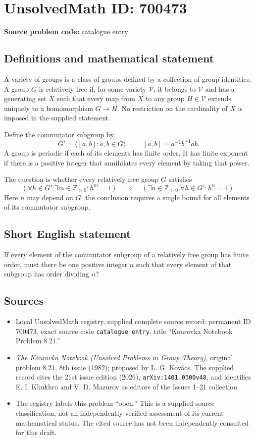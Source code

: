 \documentclass[11pt]{article}
\newcommand{\Z}{\mathbb{Z}}
\begin{document}
\section*{UnsolvedMath ID: 700473}
\textbf{Source problem code:} catalogue entry
\subsection{Definitions and mathematical statement}
A variety of groups is a class of groups defined by a collection of group identities. A group \(G\) is relatively free if, for some variety \(\mathcal V\), it belongs to \(\mathcal V\) and has a generating set \(X\) such that every map from \(X\) to any group \(H\in\mathcal V\) extends uniquely to a homomorphism \(G\to H\). No restriction on the cardinality of \(X\) is imposed in the supplied statement.

Define the commutator subgroup by
\[
G'=\langle [a,b]:a,b\in G\rangle,
\qquad [a,b]=a^{-1}b^{-1}ab.
\]
A group is periodic if each of its elements has finite order. It has finite exponent if there is a positive integer that annihilates every element by taking that power.

The question is whether every relatively free group \(G\) satisfies
\[
\left(\forall h\in G'\;\exists m\in\Z_{>0}:h^m=1\right)
\quad\Longrightarrow\quad
\left(\exists n\in\Z_{>0}\;\forall h\in G':h^n=1\right).
\]
Here \(n\) may depend on \(G\); the conclusion requires a single bound for all elements of its commutator subgroup.
\subsection{Short English statement}
If every element of the commutator subgroup of a relatively free group has finite order, must there be one positive integer \(n\) such that every element of that subgroup has order dividing \(n\)?
\subsection{Sources}
\begin{itemize}
\item Local UnsolvedMath registry, supplied complete source record: permanent ID \(700473\), exact source code \texttt{catalogue entry}, title ``Kourovka Notebook Problem 8.21.''
\item \emph{The Kourovka Notebook (Unsolved Problems in Group Theory)}, original problem 8.21, 8th issue (1982); proposed by L. G. Kov\'acs. The supplied record cites the 21st issue edition (2026), \texttt{arXiv:1401.0300v48}, and identifies E. I. Khukhro and V. D. Mazurov as editors of the Issues 1--21 collection.
\item The registry labels this problem ``open.'' This is a supplied source classification, not an independently verified assessment of its current mathematical status. The cited source has not been independently consulted for this draft.
\end{itemize}
\end{document}
